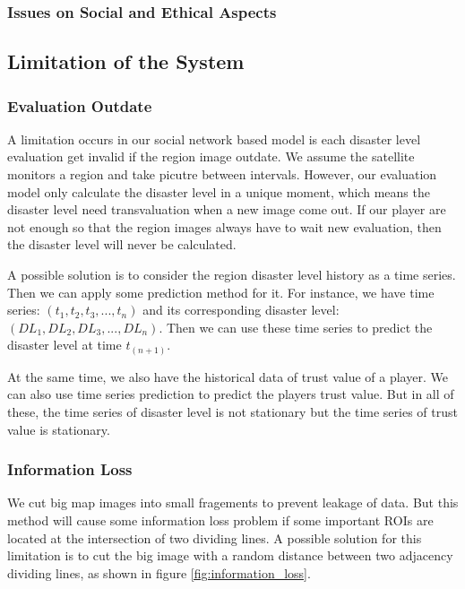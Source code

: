   \subsubsection{Issues on Social and Ethical Aspects}

\subsection{Limitation of the System}

  \subsubsection{Evaluation Outdate}

  A limitation occurs in our social network based model is each disaster level evaluation get invalid 
  if the region image outdate. 
  We assume the satellite monitors a region and take picutre between intervals. However, our evaluation
  model only calculate the disaster level in a unique moment, which means the disaster level need 
  transvaluation when a new image come out.
  If our player are not enough so that the region images always have to wait new evaluation, then the
  disaster level will never be calculated.

  A possible solution is to consider the region disaster level history as a time series. Then we can apply
  some prediction method for it. For instance, we have time series: $(t_1, t_2, t_3, ..., t_n)$
  and its corresponding disaster level: $(DL_1, DL_2, DL_3, ..., DL_n)$.
  Then we can use these time series to predict the disaster level at time $t_(n+1)$.

  At the same time, we also have the historical data of trust value of a player. We can also
  use time series prediction to predict the players trust value. But in all of these, the time series
  of disaster level is not stationary but the time series of trust value is stationary.

  \subsubsection{Information Loss}
  We cut big map images into small fragements to prevent leakage of data. But this method will cause some information loss problem if some important ROIs are located at the intersection of two dividing lines.
  A possible solution for this limitation is to cut the big image with a random distance between two adjacency dividing lines, as shown in figure \ref{fig:information_loss}.

